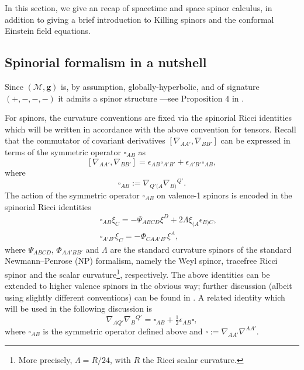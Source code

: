 \documentclass[10pt,a4paper]{article}
\theoremstyle{plain}
\def\bmg{{\bm g}}
\begin{document}
In this section, we give an recap of spacetime and space spinor
calculus, in addition to giving a brief introduction to Killing
spinors and the conformal Einstein field equations.

\subsection{Spinorial formalism in a nutshell}
\label{NotationAndSpinorFormalism}

Since $(\mathcal{M}, \bmg)$ is, by assumption, globally-hyperbolic, and of signature $(+, -, -, -)$ it
admits a spinor structure ---see Proposition $4$ in
\cite{CFEbook}. 

\medskip

For spinors, the curvature conventions are fixed via the spinorial
Ricci identities which will be written in accordance with the above
convention for tensors.  Recall that the commutator of
covariant derivatives $[ \nabla_{AA'},\nabla_{BB'}]$ can be expressed
in terms of the symmetric operator $\square_{AB}$ as
\[
[ \nabla_{AA'},\nabla_{BB'}]= \epsilon_{AB}\square_{A'B'} +
\epsilon_{A'B'}\square_{AB},
\]
where
\[
\square_{AB} := \nabla_{Q'(A} \nabla_{B)}{}^{Q'}.
\]
 The action of the symmetric operator $\square_{AB}$ on valence-1
 spinors is encoded in the spinorial Ricci identities
\begin{subequations}
\begin{eqnarray}
&& \square_{AB}\xi_{C}=-\Psi_{ABCD} \xi^{D} +
  2\Lambda\xi_{(A}\epsilon_{B)C},
 \label{SpinorialRicciIdentities1} \\
&& \square_{A'B'}\xi_{C}=-\Phi_{CA A' B'}\xi^{A},
\label{SpinorialRicciIdentities2}
\end{eqnarray}
\end{subequations}
where $\Psi_{ABCD}$, $\Phi_{AA'BB'}$ and $\Lambda$ are the standard curvature spinors of the standard Newmann--Penrose (NP) formalism, namely the Weyl spinor, tracefree Ricci spinor and the scalar curvature\footnote{More precisely, $\Lambda=R/24$, with $R$ the Ricci scalar curvature.}, respectively.  The above identities can be extended to higher valence
spinors in the obvious way; further discussion (albeit using
slightly different conventions) can be found in \cite{Ste91}. A
related identity which will be used in the following
discussion is
\begin{equation}\label{DecomposeDoubleDerivativeContracted}
\nabla_{AQ'}\nabla_{B}{}^{Q'}=\square_{AB}+
\tfrac{1}{2}\epsilon_{AB}\square,
\end{equation}
where $\square_{AB}$ is the symmetric operator defined above and
$\square := \nabla_{AA'}\nabla^{AA'}.$
\medskip 
\end{document}
